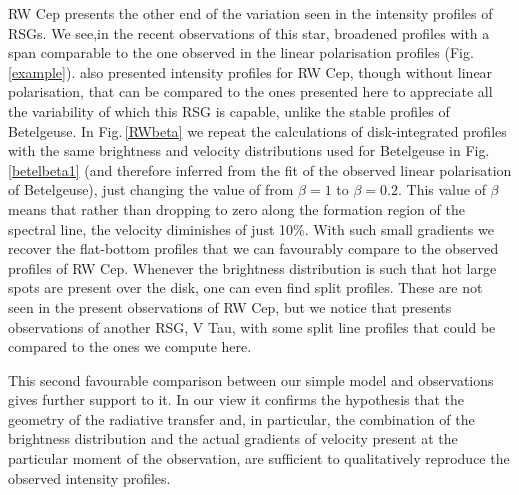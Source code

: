 \documentclass{/Users/art2/TeX/aanda/aa}
\begin{document}
RW Cep presents the other end of the variation seen in the intensity profiles of RSGs. We see,in the recent observations of this star, 
broadened profiles with a span comparable to the one observed in the linear polarisation profiles (Fig. \ref{example}). 
\cite{josselin_atmospheric_2007} also 
presented intensity profiles for RW Cep, though without linear polarisation, that can be compared to the ones presented here to appreciate 
all the variability of which this RSG is capable, unlike the stable profiles of Betelgeuse.
 In Fig.\,\ref{RWbeta} we repeat 
the  calculations of disk-integrated profiles with the same brightness and velocity distributions used for Betelgeuse in Fig.\,\ref{betelbeta1}
(and therefore inferred  
from the fit of the observed linear polarisation of Betelgeuse), just changing the value of from $\beta=1$ to $\beta=0.2$. This value of $\beta$ means 
that rather than dropping to zero along the formation region of the spectral line, the velocity diminishes of just 10\%. With such 
small gradients we recover the flat-bottom profiles that we can favourably compare to the observed profiles of RW Cep. Whenever 
the brightness distribution is such that hot large spots are present over the disk, one can even find split profiles. These are not 
seen in the present observations of RW Cep, but we notice that \cite{kravchenko_tomography_2018} presents observations of another RSG, V Tau, with 
some split line profiles that could be compared to the ones we compute here. 

This second favourable comparison between our simple model and observations gives further support to it. In our view it confirms 
the hypothesis that the geometry of the radiative transfer and, in particular, the combination of the brightness distribution and 
the actual gradients of velocity present at the particular moment of the observation, are sufficient to qualitatively reproduce 
the observed intensity profiles. 
\end{document}
